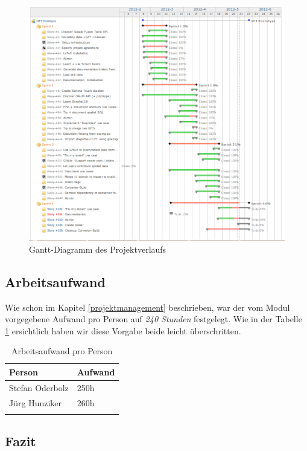 \begin{figure}[H]
	\centering
	\includegraphics[width=\textwidth]{images/projektmanagement/overall_stories_gantt_chart}
	\caption{Gantt-Diagramm des Projektverlaufs}
	\label{overall_stories_gantt_chart}
\end{figure}

\subsection{Arbeitsaufwand}
Wie schon im Kapitel \ref{projektmanagement} beschrieben, war der vom Modul vorgegebene Aufwand pro Person auf \emph{240 Stunden} festgelegt. Wie in der Tabelle \ref{projektmanagement-arbeitsaufwand} ersichtlich haben wir diese Vorgabe beide leicht überschritten.

\begin{longtable}{|l|l|}
\hline 
\textbf{Person} & \textbf{Aufwand} \\ 
\hline 
Stefan Oderbolz & 250h \\ 
\hline 
Jürg Hunziker & 260h \\ 
\hline 
\caption{Arbeitsaufwand pro Person}
\label{projektmanagement-arbeitsaufwand}
\end{longtable} 

\subsection{Fazit}
